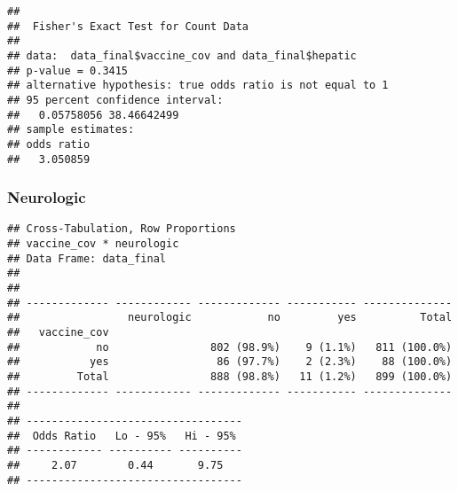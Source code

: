 \documentclass[
]{article}
\newenvironment{Shaded}{\begin{snugshade}}{\end{snugshade}}
\newcommand{\AttributeTok}[1]{\textcolor[rgb]{0.77,0.63,0.00}{#1}}
\newcommand{\ConstantTok}[1]{\textcolor[rgb]{0.00,0.00,0.00}{#1}}
\newcommand{\FunctionTok}[1]{\textcolor[rgb]{0.00,0.00,0.00}{#1}}
\newcommand{\NormalTok}[1]{#1}
\newcommand{\SpecialCharTok}[1]{\textcolor[rgb]{0.00,0.00,0.00}{#1}}
\newcommand{\StringTok}[1]{\textcolor[rgb]{0.31,0.60,0.02}{#1}}
\begin{document}
\begin{Shaded}
\end{Shaded}

\begin{verbatim}
## 
##  Fisher's Exact Test for Count Data
## 
## data:  data_final$vaccine_cov and data_final$hepatic
## p-value = 0.3415
## alternative hypothesis: true odds ratio is not equal to 1
## 95 percent confidence interval:
##   0.05758056 38.46642499
## sample estimates:
## odds ratio 
##   3.050859
\end{verbatim}

\hypertarget{neurologic}{%
\subsubsection{Neurologic}\label{neurologic}}

\begin{Shaded}
\end{Shaded}

\begin{verbatim}
## Cross-Tabulation, Row Proportions  
## vaccine_cov * neurologic  
## Data Frame: data_final  
## 
## 
## ------------- ------------ ------------- ----------- --------------
##                 neurologic            no         yes          Total
##   vaccine_cov                                                      
##            no                802 (98.9%)    9 (1.1%)   811 (100.0%)
##           yes                 86 (97.7%)    2 (2.3%)    88 (100.0%)
##         Total                888 (98.8%)   11 (1.2%)   899 (100.0%)
## ------------- ------------ ------------- ----------- --------------
## 
## ----------------------------------
##  Odds Ratio   Lo - 95%   Hi - 95% 
## ------------ ---------- ----------
##     2.07        0.44       9.75   
## ----------------------------------
\end{verbatim}
\end{document}
